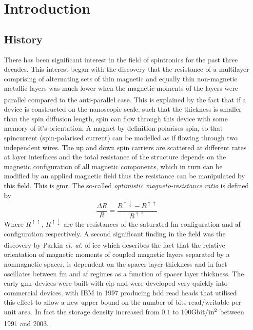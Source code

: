 \documentclass[a4paper, 12pt]{article}
\begin{document}
	\section{Introduction}
	\subsection{History}\label{history}
	There has been significant interest in the field of spintronics for the past three decades. This interest began with the discovery that the resistance of a multilayer comprising of alternating sets of thin magnetic and equally thin non-magnetic metallic layers was much lower when the magnetic moments of the layers were parallel compared to the anti-parallel case\textcolor{blue}{\textsuperscript{\cite{rev3, GMR1, GMR2}}}. This is explained by the fact that if a device is constructed on the nanoscopic scale, such that the thickness is smaller than the spin diffusion length, spin can flow through this device with some memory of it's orientation. A magnet by definition polarises spin, so that spincurrent (spin-polarised current) can be modelled as if flowing through two independent wires. The up and down spin carriers are scattered at different rates at layer interfaces and the total resistance of the structure depends on the magnetic configuration of all magnetic components, which in turn can be modified by an applied magnetic field thus the resistance can be manipulated by this field. 
This is \gls{gmr}. The so-called {\it optimistic magneto-resistance ratio} is defined by
	\begin{equation}
		\frac{\Delta R}{R}=\frac{R^{\uparrow \downarrow}-R^{\uparrow\uparrow}}{R^{\uparrow\uparrow}}
	\end{equation}
	Where $R^{\uparrow\uparrow}$, $R^{\uparrow\downarrow}$ are the resistances of the saturated \gls{fm} configuration and \gls{af} configuration respectively. 
	A second significant finding in the field was the discovery by Parkin \textit{et. al.}\textcolor{blue}{\textsuperscript{\cite{Parkin}}} of \gls{iec} 
	which describes the fact that the relative orientation of magnetic moments of coupled magnetic layers separated by a nonmagnetic spacer, is dependent on the spacer layer thickness and in fact oscillates between \gls{fm} and \gls{af} regimes as a function of spacer layer thickness. 
	The early \gls{gmr} devices were built with \gls{cip} and were developed very quickly into commercial devices, with IBM in 1997 producing \gls{hdd} read heads that utilised this effect to allow a new upper bound on the number of bits read/writable per unit area. In fact the storage density increased from $0.1$ to $100$Gbit/i$\rm n^2$ between 1991 and 2003\textcolor{blue}{\textsuperscript{\cite{Mathon2016}}}.  
\end{document}
